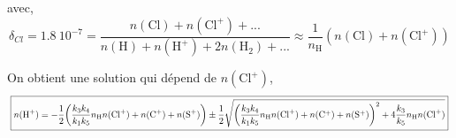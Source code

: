 avec,
\begin{equation}
    \delta_{Cl} = \SI{1.8}{10^{-7}} = \frac{n(\mathrm{Cl}) + n(\mathrm{Cl}^+) + ...}{n(\mathrm{H}) + n(\mathrm{H}^+) + 2n(\mathrm{H}_2) + ...} \approx \frac{1}{n_{\mathrm{H}}} (n(\mathrm{Cl}) + n(\mathrm{Cl}^+) )
\end{equation}

On obtient une solution qui dépend de $n(\mathrm{Cl}^+)$,
\begin{equation}
\resizebox{1.1\hsize}{!}{
    \boxed{n(\mathrm{H}^+) = -\frac{1}{2} \bigg( \frac{k_3 k_4}{k_1 k_5} n_{\mathrm{H}} n(\mathrm{Cl}^+) + n(\mathrm{C}^+)+ n(\mathrm{S}^+) \bigg) \pm \frac{1}{2} \sqrt{\bigg( \frac{k_3 k_4}{k_1 k_5} n_{\mathrm{H}} n(\mathrm{Cl}^+) + n(\mathrm{C}^+)+ n(\mathrm{S}^+) \bigg)^2 + 4\frac{k_3}{k_5}n_{\mathrm{H}} n(\mathrm{Cl}^+)}}
    }
\end{equation}





